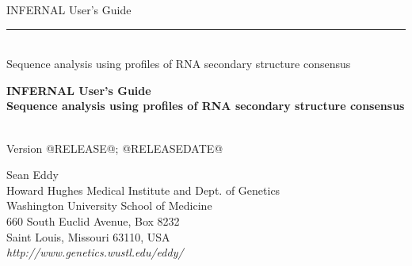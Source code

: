 \begin{titlepage}
{\Large

\vspace*{\fill}

\begin{latexonly}
\noindent
{\Huge \textsf{INFERNAL User's Guide}} \\ 
\rule[2pt]{\textwidth}{1pt} \\
\hspace*{\fill} {\large \textsf{Sequence analysis using profiles of RNA secondary structure consensus}\\}
\end{latexonly}

\begin{htmlonly}
\begin{center}
{\Huge \textbf{INFERNAL User's Guide}}\\
{\large \textbf{Sequence analysis using profiles of RNA secondary
structure consensus}}\\
\end{center}
\end{htmlonly}

\vspace*{\fill}

\begin{center}
\textsl{}\\
Version @RELEASE@; @RELEASEDATE@ \\ 

\vspace*{\fill}

Sean Eddy\\
Howard Hughes Medical Institute and Dept. of Genetics\\
Washington University School of Medicine\\
660 South Euclid Avenue, Box 8232\\
Saint Louis, Missouri 63110, USA\\
\textsl{http://www.genetics.wustl.edu/eddy/} \\
\end{center}

\vspace*{\fill}

}
\end{titlepage}
